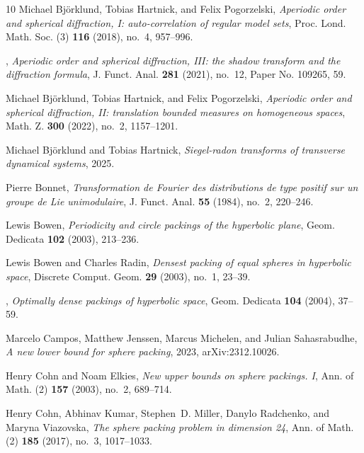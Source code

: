 \documentclass[12pt,reqno,a4paper]{amsart}
\theoremstyle{theorem}
\theoremstyle{definition}
\numberwithin{theorem}{section}
\numberwithin{equation}{section}
\begin{document}
\begin{thebibliography}{10}
Michael Bj\"{o}rklund, Tobias Hartnick, and Felix Pogorzelski, \emph{Aperiodic
  order and spherical diffraction, {I}: auto-correlation of regular model
  sets}, Proc. Lond. Math. Soc. (3) \textbf{116} (2018), no.~4, 957--996.

\bysame, \emph{Aperiodic order and spherical diffraction, {III}: the shadow
  transform and the diffraction formula}, J. Funct. Anal. \textbf{281} (2021),
  no.~12, Paper No. 109265, 59. 

Michael Bj\"orklund, Tobias Hartnick, and Felix Pogorzelski, \emph{Aperiodic
  order and spherical diffraction, {II}: translation bounded measures on
  homogeneous spaces}, Math. Z. \textbf{300} (2022), no.~2, 1157--1201.

Michael Björklund and Tobias Hartnick, \emph{Siegel-radon transforms of
  transverse dynamical systems}, 2025.

Pierre Bonnet, \emph{Transformation de {F}ourier des distributions de type
  positif sur un groupe de {L}ie unimodulaire}, J. Funct. Anal. \textbf{55}
  (1984), no.~2, 220--246. 

Lewis Bowen, \emph{Periodicity and circle packings of the hyperbolic plane},
  Geom. Dedicata \textbf{102} (2003), 213--236. 

Lewis Bowen and Charles Radin, \emph{Densest packing of equal spheres in
  hyperbolic space}, Discrete Comput. Geom. \textbf{29} (2003), no.~1, 23--39.

\bysame, \emph{Optimally dense packings of hyperbolic space}, Geom. Dedicata
  \textbf{104} (2004), 37--59. 

Marcelo Campos, Matthew Jenssen, Marcus Michelen, and Julian Sahasrabudhe,
  \emph{A new lower bound for sphere packing}, 2023, arXiv:2312.10026.

Henry Cohn and Noam Elkies, \emph{New upper bounds on sphere packings. {I}},
  Ann. of Math. (2) \textbf{157} (2003), no.~2, 689--714. 

Henry Cohn, Abhinav Kumar, Stephen~D. Miller, Danylo Radchenko, and Maryna
  Viazovska, \emph{The sphere packing problem in dimension 24}, Ann. of Math.
  (2) \textbf{185} (2017), no.~3, 1017--1033. 


\end{thebibliography}
\end{document}
